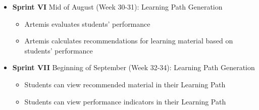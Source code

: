 \documentclass[a4paper,12pt,twoside]{article}
\begin{document}
\begin{itemize}
        \item \textbf{Sprint VI} Mid of August (Week 30-31): Learning Path Generation
              \begin{itemize}
                      \item Artemis evaluates students' performance
                      \item Artemis calculates recommendations for learning material based on students' performance
              \end{itemize}

        \item \textbf{Sprint VII} Beginning of September (Week 32-34): Learning Path Generation
              \begin{itemize}
                      \item Students can view recommended material in their Learning Path
                      \item Students can view performance indicators in their Learning Path
              \end{itemize}
\end{itemize}

\clearpage

\clearpage


\end{document}
